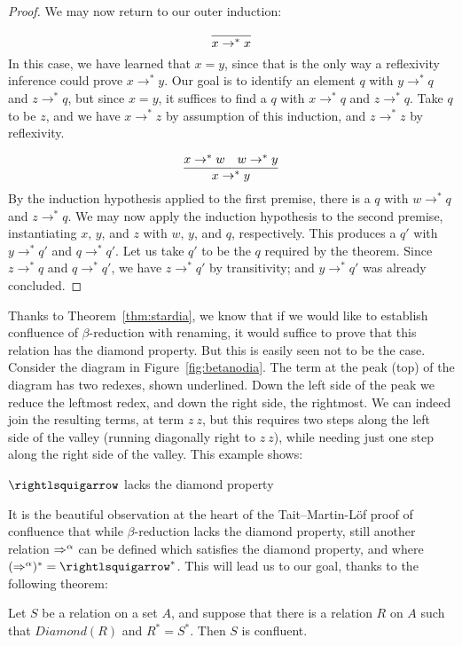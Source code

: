 \begin{proof}
  We may now return to our outer induction:

  \case{ }
  \[
  \infer{x \to^* x}{\ }
  \]
  \noindent In this case, we have learned that $x = y$, since that is the only way a reflexivity
  inference could prove $x \to^* y$.  Our goal is to identify an element $q$ with $y \to^* q$ and $z \to^* q$,
  but since $x = y$, it suffices to find a $q$ with $x \to^* q$ and $z \to^* q$.  Take $q$ to be $z$, and
  we have $x \to^* z$ by assumption of this induction, and $z \to^* z$ by reflexivity.

  \case{ }
  \[
  \infer{x \to^* y}{x \to^* w & w \to^* y}
  \]
  \noindent By the induction hypothesis applied to the first premise, there is a $q$ with
  $w \to^* q$ and $z \to^* q$.  We may now apply the induction hypothesis to the second
  premise, instantiating $x$, $y$, and $z$ with $w$, $y$, and $q$, respectively.  This
  produces a $q'$ with $y\to^* q'$ and $q\to^* q'$.  Let us take $q'$ to be the $q$ required
  by the theorem.  Since $z\to^*q$ and $q\to^* q'$, we have $z \to^* q'$ by transitivity;
  and $y\to^* q'$ was already concluded.
  

  \end{proof}

Thanks to Theorem~\ref{thm:stardia}, we know that if we would like to establish confluence of $\beta$-reduction
with renaming, it would suffice to prove that this relation has the diamond property.  But this is easily seen
not to be the case.  Consider the diagram in Figure~\ref{fig:betanodia}.  The term at the peak (top) of the diagram
has two redexes, shown underlined.  Down the left side of the peak we reduce the leftmost redex, and down the right
side, the rightmost.  We can indeed join the resulting terms, at term $z\ z$, but this requires two steps along the
left side of the valley (running diagonally right to $z\ z$), while needing just one step along the right
side of the valley.  This example shows:

\begin{theorem}
  $\betaa$ lacks the diamond property
\end{theorem}

It is the beautiful observation at the heart of the Tait--Martin-L\"of proof of confluence that
while $\beta$-reduction lacks the diamond property, still another relation $\Rightarrow^\alpha$ can be defined which
satisfies the diamond property, and where $(\Pred^\alpha)^* = \betaa^*$.  This will lead us to our goal,
thanks to the following theorem:
\begin{theorem}
  \label{thm:tml}
  Let $S$ be a relation on a set $A$, and suppose that there is a relation $R$ on $A$ such that
  $\textit{Diamond}(R)$ and $R^* = S^*$.  Then $S$ is confluent.
\end{theorem}

